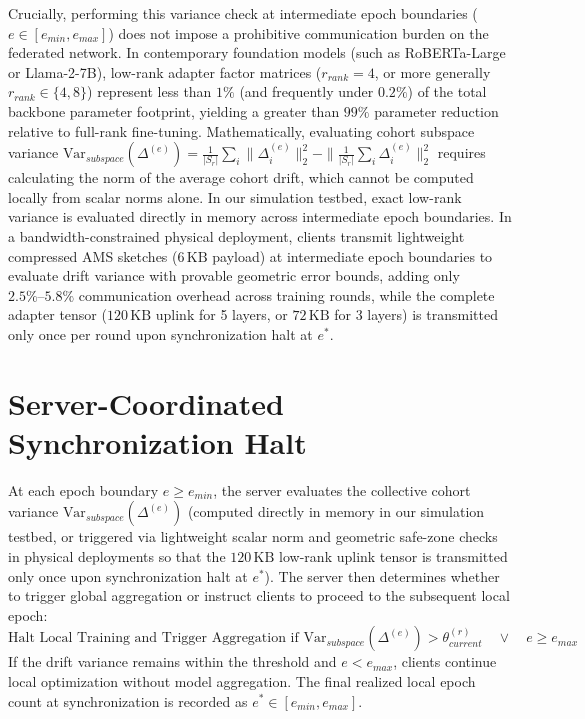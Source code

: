 Crucially, performing this variance check at intermediate epoch boundaries ($e \in [e_{min}, e_{max}]$) does not impose a prohibitive communication burden on the federated network. In contemporary foundation models (such as RoBERTa-Large or Llama-2-7B), low-rank adapter factor matrices ($r_{rank} = 4$, or more generally $r_{rank} \in \{4, 8\}$) represent less than $1\%$ (and frequently under $0.2\%$) of the total backbone parameter footprint, yielding a greater than $99\%$ parameter reduction relative to full-rank fine-tuning. Mathematically, evaluating cohort subspace variance $\text{Var}_{subspace}(\Delta^{(e)}) = \frac{1}{|S_r|} \sum_{i} \|\Delta_i^{(e)}\|_2^2 - \|\frac{1}{|S_r|} \sum_{i} \Delta_i^{(e)}\|_2^2$ requires calculating the norm of the average cohort drift, which cannot be computed locally from scalar norms alone. In our simulation testbed, exact low-rank variance is evaluated directly in memory across intermediate epoch boundaries. In a bandwidth-constrained physical deployment, clients transmit lightweight compressed AMS sketches ($6\,\text{KB}$ payload) at intermediate epoch boundaries to evaluate drift variance with provable geometric error bounds, adding only $2.5\%\text{--}5.8\%$ communication overhead across training rounds, while the complete adapter tensor ($120\,\text{KB}$ uplink for 5 layers, or $72\,\text{KB}$ for 3 layers) is transmitted only once per round upon synchronization halt at $e^*$.

\section{Server-Coordinated Synchronization Halt}
At each epoch boundary $e \ge e_{min}$, the server evaluates the collective cohort variance $\text{Var}_{subspace}(\Delta^{(e)})$ (computed directly in memory in our simulation testbed, or triggered via lightweight scalar norm and geometric safe-zone checks in physical deployments so that the $120\,\text{KB}$ low-rank uplink tensor is transmitted only once upon synchronization halt at $e^*$). The server then determines whether to trigger global aggregation or instruct clients to proceed to the subsequent local epoch:
\begin{equation}
    \text{Halt Local Training and Trigger Aggregation if } \text{Var}_{subspace}(\Delta^{(e)}) > \theta_{current}^{(r)} \quad \lor \quad e \ge e_{max}
    \label{eq:halt_cond}
\end{equation}
If the drift variance remains within the threshold and $e < e_{max}$, clients continue local optimization without model aggregation. The final realized local epoch count at synchronization is recorded as $e^* \in [e_{min}, e_{max}]$.

